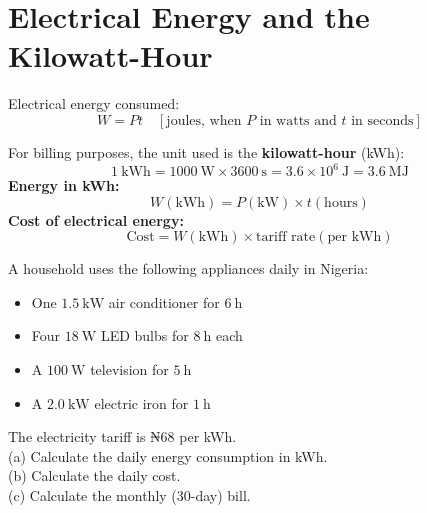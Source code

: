 \section{Electrical Energy and the Kilowatt-Hour}

\begin{definitionbox}
Electrical energy consumed:
\[
  W = Pt \quad [\text{joules, when } P \text{ in
  watts and } t \text{ in seconds}]
\]

For billing purposes, the unit used is the
\textbf{kilowatt-hour} (kWh):
\[
  1\ \text{kWh} = 1000\ \text{W} \times 3600\ \text{s}
  = 3.6\times10^6\ \text{J} = 3.6\ \text{MJ}
\]
\textbf{Energy in kWh:}
\[
  W(\text{kWh}) = P(\text{kW}) \times t(\text{hours})
\]
\textbf{Cost of electrical energy:}
\[
  \text{Cost} = W(\text{kWh}) \times \text{tariff rate}
  (\text{per kWh})
\]
\end{definitionbox}

\begin{examplebox}[24.2]
A household uses the following appliances daily in
Nigeria:
\begin{itemize}[noitemsep]
  \item One $1.5\ \text{kW}$ air conditioner for
  $6\ \text{h}$
  \item Four $18\ \text{W}$ LED bulbs for $8\ \text{h}$
  each
  \item A $100\ \text{W}$ television for $5\ \text{h}$
  \item A $2.0\ \text{kW}$ electric iron for $1\ \text{h}$
\end{itemize}
The electricity tariff is ₦68 per kWh.\\
(a) Calculate the daily energy consumption in kWh.\\
(b) Calculate the daily cost.\\
(c) Calculate the monthly (30-day) bill.
\end{examplebox}

